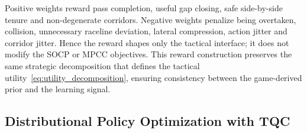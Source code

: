 \documentclass{iopjournal}
\begin{document}
Positive weights reward pass completion, useful gap closing, safe
side-by-side tenure and non-degenerate corridors.  Negative weights penalize
being overtaken, collision, unnecessary raceline deviation, lateral
compression, action jitter and corridor jitter.  Hence the reward shapes only
the tactical interface; it does not modify the SOCP or MPCC objectives.
This reward construction preserves the same strategic decomposition that
defines the tactical utility~\eqref{eq:utility_decomposition}, ensuring
consistency between the game-derived prior and the learning signal.

\subsection{Distributional Policy Optimization with TQC}
\label{subsec:tqc_optimization}
\end{document}
